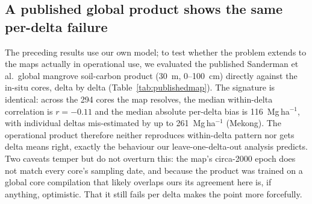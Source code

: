 \documentclass[11pt]{article}
\begin{document}
\begin{table}[t]
\centering
\caption{Per-delta leave-one-delta-out results (gradient boosting, full covariate set):
sample size, global $R^2$, within-delta Pearson $r$ (the pattern the model captures),
RMSE and bias (Mg\,ha$^{-1}$), and fraction inside the area of applicability. The near-zero
$r$ values show that out-of-delta the model recovers little within-delta pattern, while
the large bias shows it also misses the level.}
\label{tab:perdelta}

\end{table}

\subsection{A published global product shows the same per-delta failure}
The preceding results use our own model; to test whether the problem extends to the maps
actually in operational use, we evaluated the published Sanderman et al.\ global mangrove
soil-carbon product (30~m, 0--100~cm) directly against the in-situ cores, delta by delta
(Table~\ref{tab:publishedmap}). The signature is identical: across the 294 cores the map
resolves, the median within-delta correlation is $r=-0.11$ and the median absolute
per-delta bias is 116~Mg\,ha$^{-1}$, with individual deltas mis-estimated by up to
261~Mg\,ha$^{-1}$ (Mekong). The operational product therefore neither reproduces
within-delta pattern nor gets delta means right, exactly the behaviour our
leave-one-delta-out analysis predicts. Two caveats temper but do not overturn this: the
map's circa-2000 epoch does not match every core's sampling date, and because the
product was trained on a global core compilation that likely overlaps ours its agreement
here is, if anything, optimistic. That it still fails per delta makes the point more
forcefully.

\begin{table}[t]
\centering
\caption{The published Sanderman et al.\ mangrove SOC map evaluated against in-situ cores
per delta: number of cores resolved, median observed and mapped SOC, mean bias, and
within-delta correlation.}
\label{tab:publishedmap}

\end{table}
\end{document}
